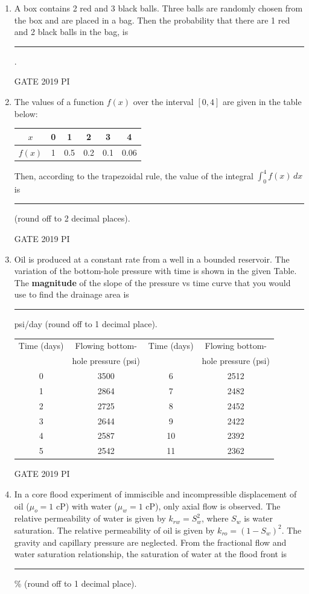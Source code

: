 \documentclass[journal,12pt,onecolumn]{IEEEtran}
\theoremstyle{remark}
\begin{document}
\begin{enumerate}
\item A box contains 2 red and 3 black balls. Three balls are randomly chosen from the box and are placed in a bag. Then the probability that there are 1 red and 2 black balls in the bag, is \rule{3cm}{0.15mm}.

\hfill{GATE 2019 PI}

\item The values of a function $f(x)$ over the interval $[0,4]$ are given in the table below:

\begin{center}
\begin{tabular}{|c|c|c|c|c|c|}
\hline
$x$      & 0   & 1   & 2   & 3   & 4    \\
\hline
$f(x)$   & 1   & 0.5 & 0.2 & 0.1 & 0.06 \\
\hline
\end{tabular}
\end{center}

Then, according to the trapezoidal rule, the value of the integral $\int_{0}^{4} f(x)\,dx$ is \rule{3cm}{0.15mm} (round off to 2 decimal places).

\hfill{GATE 2019 PI}
\item Oil is produced at a constant rate from a well in a bounded reservoir. The variation of the bottom-hole pressure with time is shown in the given Table. The \textbf{magnitude} of the slope of the pressure vs time curve that you would use to find the drainage area is \rule{2.5cm}{0.15mm} psi/day (round off to 1 decimal place).

\begin{center}
\begin{tabular}{|c|c|c|c|}
\hline
Time (days) & Flowing bottom- & Time (days) & Flowing bottom- \\
            & hole pressure (psi) &           & hole pressure (psi) \\
\hline
0 & 3500 & 6  & 2512 \\
1 & 2864 & 7  & 2482 \\
2 & 2725 & 8  & 2452 \\
3 & 2644 & 9  & 2422 \\
4 & 2587 & 10 & 2392 \\
5 & 2542 & 11 & 2362 \\
\hline
\end{tabular}
\end{center}

\hfill{GATE 2019 PI}

\item In a core flood experiment of immiscible and incompressible displacement of oil ($\mu_o = 1$ cP) with water ($\mu_w = 1$ cP), only axial flow is observed. The relative permeability of water is given by $k_{rw} = S_w^2$, where $S_w$ is water saturation. The relative permeability of oil is given by $k_{ro} = (1-S_w)^2$. The gravity and capillary pressure are neglected. From the fractional flow and water saturation relationship, the saturation of water at the flood front is \rule{2.5cm}{0.15mm} \% (round off to 1 decimal place).


\end{enumerate}
\end{document}
